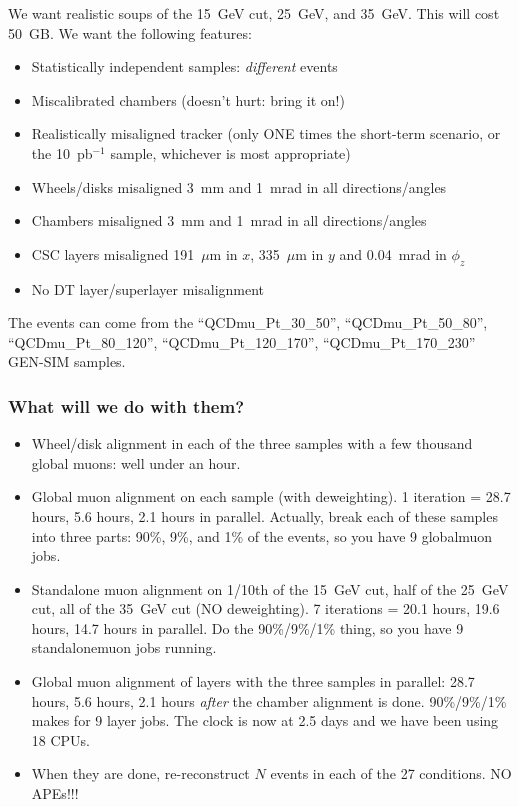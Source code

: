 \documentclass[compress]{beamer}
\begin{document}
\begin{frame}
We want realistic soups of the 15~GeV cut, 25~GeV, and 35~GeV.  This
will cost 50~GB.  We want the following features:
\begin{itemize}
\item Statistically independent samples: {\it different} events
\item Miscalibrated chambers (doesn't hurt: bring it on!)
\item Realistically misaligned tracker (only ONE times the short-term scenario, or the 10~pb$^{-1}$ sample, whichever is most appropriate)
\item Wheels/disks misaligned 3~mm and 1~mrad in all directions/angles
\item Chambers misaligned 3~mm and 1~mrad in all directions/angles
\item CSC layers misaligned 191~$\mu$m in $x$, 335~$\mu$m in $y$ and 0.04~mrad in $\phi_z$
\item No DT layer/superlayer misalignment
\end{itemize}
The events can come from the ``QCDmu\_Pt\_30\_50'', ``QCDmu\_Pt\_50\_80'', ``QCDmu\_Pt\_80\_120'', ``QCDmu\_Pt\_120\_170'', ``QCDmu\_Pt\_170\_230'' GEN-SIM samples.
\end{frame}

\begin{frame}
\frametitle{What will we do with them?}
\begin{itemize}
\item Wheel/disk alignment in each of the three samples with a few thousand global muons: well under an hour.
\item Global muon alignment on each sample (with deweighting).  1 iteration = 28.7 hours, 5.6 hours, 2.1 hours in parallel.  Actually, break each of these samples into three parts: 90\%, 9\%, and 1\% of the events, so you have 9 globalmuon jobs.
\item Standalone muon alignment on 1/10th of the 15~GeV cut, half of the 25~GeV cut, all of the 35~GeV cut (NO deweighting).  7 iterations = 20.1 hours, 19.6 hours, 14.7 hours in parallel.  Do the 90\%/9\%/1\% thing, so you have 9 standalonemuon jobs running.
\item Global muon alignment of layers with the three samples in parallel: 28.7 hours, 5.6 hours, 2.1 hours {\it after} the chamber alignment is done.  90\%/9\%/1\% makes for 9 layer jobs.  The clock is now at 2.5 days and we have been using 18 CPUs.
\item When they are done, re-reconstruct $N$ events in each of the 27 conditions.  NO APEs!!!
\end{itemize}

\end{frame}
\end{document}
